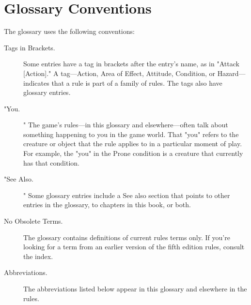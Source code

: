 \documentclass[10pt,a4paper,twoside,bg=print,twocolumn,openany,nodeprecatedcode]{dndarticle}
\begin{document}
\section{Glossary Conventions}

The glossary uses the following conventions:

\begin{description}
\item[Tags in Brackets.]
Some entries have a tag in brackets after the entry's name, as in "Attack [Action]." A tag—Action, Area of Effect, Attitude, Condition, or Hazard—indicates that a rule is part of a family of rules. The tags also have glossary entries.
\item["You.]
" The game's rules—in this glossary and elsewhere—often talk about something happening to you in the game world. That "you" refers to the creature or object that the rule applies to in a particular moment of play. For example, the "you" in the Prone condition is a creature that currently has that condition.
\item["See Also.]
" Some glossary entries include a See also section that points to other entries in the glossary, to chapters in this book, or both.
\item[No Obsolete Terms.]
The glossary contains definitions of current rules terms only. If you're looking for a term from an earlier version of the fifth edition rules, consult the index.
\item[Abbreviations.]
The abbreviations listed below appear in this glossary and elsewhere in the rules.
\end{description}
\end{document}
